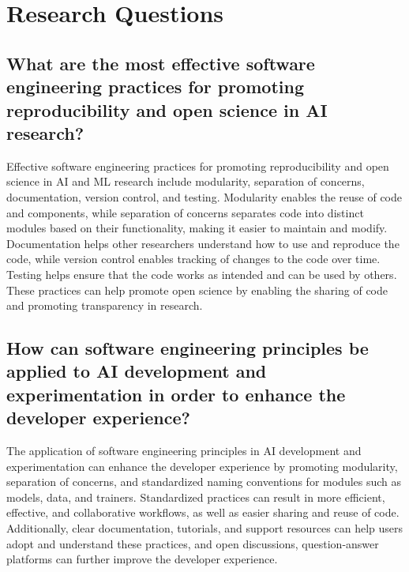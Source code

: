 
\section{Research Questions}


\subsection{
    What are the most effective software engineering practices for promoting reproducibility and open science in AI research?}
    Effective software engineering practices for promoting reproducibility and open science in AI and ML research include modularity, separation of concerns, documentation, version control, and testing. Modularity enables the reuse of code and components, while separation of concerns separates code into distinct modules based on their functionality, making it easier to maintain and modify. Documentation helps other researchers understand how to use and reproduce the code, while version control enables tracking of changes to the code over time. Testing helps ensure that the code works as intended and can be used by others. These practices can help promote open science by enabling the sharing of code and promoting transparency in research.
    
    
    
    \subsection{How can software engineering principles be applied to AI development and experimentation in order to enhance the developer experience?}
    
    The application of software engineering principles in AI development and experimentation can enhance the developer experience by promoting modularity, separation of concerns, and standardized naming conventions for modules such as models, data, and trainers. Standardized practices can result in more efficient, effective, and collaborative workflows, as well as easier sharing and reuse of code. Additionally, clear documentation, tutorials, and support resources can help users adopt and understand these practices, and open discussions, question-answer platforms can further improve the developer experience.

